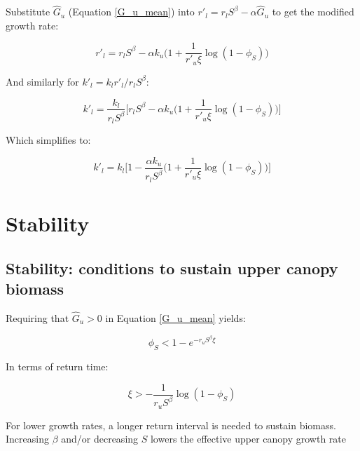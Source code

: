 \documentclass{article}
\begin{document}
    Substitute $\hat G_u$ (Equation \ref{G_u_mean}) into $r'_l = r_l S^\beta - \alpha \hat G_u$ to get the modified growth rate:
    
    \begin{equation}
    r'_l= r_l S^\beta   - \alpha k_u \big( 1 + \frac{1}{r'_u \xi} \log(1-\phi_S) \big)
    \end{equation}
    
    And similarly for  $k'_l  = k_l r'_l / r_l S^\beta$:
    
    \begin{equation}
    k'_l= \frac{k_l}{r_l S^\beta } \bigg[  r_l S^\beta   - \alpha k_u \big( 1 + \frac{1}{r'_u \xi} \log(1-\phi_S) \big) \bigg]
    \end{equation}
    
    Which simplifies to:
    
    \begin{equation}
    k'_l=  k_l  \bigg[ 1 -  \frac{  \alpha k_u} {r_l S^\beta }\big( 1 + \frac{1}{r'_u \xi} \log(1-\phi_S) \big) \bigg]
    \end{equation}
\section{Stability}

\subsection{Stability: conditions to sustain upper canopy biomass}

        Requiring that $\hat{G}_u >0$ in Equation \ref{G_u_mean} yields:
        
        \begin{equation}
        \phi_S < 1- e^{-r_u S^\beta \xi}
        \end{equation}
        
        In terms of return time:
        
        \begin{equation}
        \xi > - \frac{1}{r_u S^\beta}\log (1 - \phi_S)
        \end{equation}

	For lower growth rates, a longer return interval is needed to sustain biomass.  Increasing $\beta$ and/or decreasing $S$  lowers the effective upper canopy growth rate
	
\end{document}
